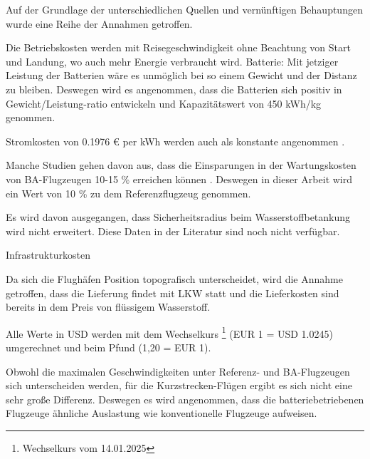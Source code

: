 
Auf der Grundlage der unterschiedlichen Quellen und vernünftigen Behauptungen wurde eine Reihe der Annahmen getroffen.

Die Betriebskosten werden mit Reisegeschwindigkeit ohne Beachtung von Start und Landung, wo auch mehr Energie verbraucht wird.
Batterie: Mit jetziger Leistung der Batterien wäre es unmöglich bei so einem Gewicht und der Distanz zu bleiben.
Deswegen wird es angenommen, dass die Batterien sich positiv in Gewicht/Leistung-ratio entwickeln und Kapazitätswert von 450 kWh/kg genommen.

Stromkosten von 0.1976 € per kWh werden auch als konstante angenommen \cite{eurostat_nrg_pc_205}.


Manche Studien gehen davon aus, dass die Einsparungen in der Wartungskosten von BA-Flugzeugen 10-15 \% erreichen können 
\cite{wangsness2021fremskyndet,avogadro2024demystifying}. Deswegen in dieser Arbeit wird ein Wert von 10 \% zu dem Referenzflugzeug genommen.

Es wird davon ausgegangen, dass Sicherheitsradius beim Wasserstoffbetankung wird nicht erweitert. Diese Daten in der Literatur sind noch nicht verfügbar.

Infrastrukturkosten

Da sich die Flughäfen Position topografisch unterscheidet, wird die Annahme getroffen, dass die Lieferung findet mit LKW statt 
und die Lieferkosten sind bereits in dem Preis von flüssigem Wasserstoff.

Alle Werte in USD werden mit dem Wechselkurs \footnote{Wechselkurs vom 14.01.2025} (EUR 1 = USD 1.0245) umgerechnet und beim Pfund (1,20 = EUR 1).




Obwohl die maximalen Geschwindigkeiten unter Referenz- und BA-Flugzeugen sich unterscheiden werden, 
für die Kurzstrecken-Flügen ergibt es sich nicht eine sehr große Differenz.
Deswegen es wird angenommen, dass die batteriebetriebenen Flugzeuge ähnliche Auslastung wie konventionelle Flugzeuge aufweisen.

